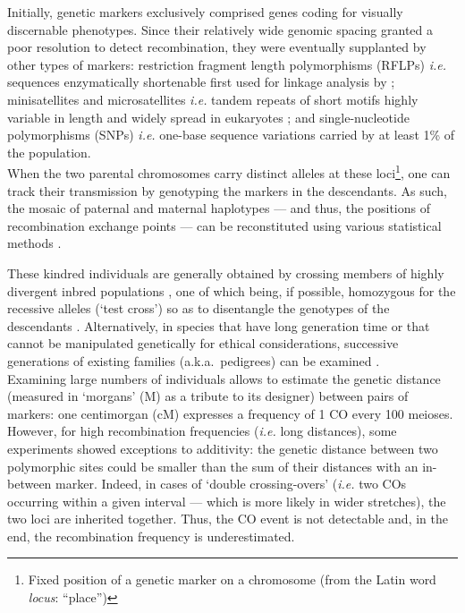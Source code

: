 Initially, genetic markers exclusively comprised genes coding for visually discernable phenotypes.
Since their relatively wide genomic spacing granted a poor resolution to detect recombination, they were eventually supplanted by other types of markers: restriction fragment length polymorphisms (RFLPs) \textit{i.e.} sequences enzymatically shortenable first used for linkage analysis by \citet{botstein1980construction}; minisatellites and microsatellites \citep{hamada1982potential} \textit{i.e.} tandem repeats of short motifs highly variable in length \citep{ellegren2004microsatellites} and widely spread in eukaryotes \citep{hamada1982novel}; and single-nucleotide polymorphisms (SNPs) \textit{i.e.} one-base sequence variations carried by at least 1\% of the population.\\

When the two parental chromosomes carry distinct alleles at these loci\footnote{Fixed position of a genetic marker on a chromosome (from the Latin word \textit{locus}: “place”)}, one can track their transmission by genotyping the markers in the descendants.
As such, the mosaic of paternal and maternal haplotypes — and thus, the positions of recombination exchange points — can be reconstituted using various statistical methods \citep[reviewed in \citealp{backstrom2009gene}]{haldane1919combination, kosambi1943estimation}.

These kindred individuals are generally obtained by crossing members of highly divergent inbred populations \citep[\textit{e.g.}][]{rowe1994maps,dietrich1996comprehensive}, one of which being, if possible, homozygous for the recessive alleles (‘test cross’) so as to disentangle the genotypes of the descendants \citep[reviewed in][]{brown2002mapping}.
Alternatively, in species that have long generation time or that cannot be manipulated genetically for ethical considerations, successive generations of existing families (a.k.a.\ pedigrees) can be examined \citep[\textit{e.g.}][]{kong2002highresolution,kong2010finescale,cox2009new}.\\

Examining large numbers of individuals allows to estimate the genetic distance (measured in ‘morgans’ (M) as a tribute to its designer) between pairs of markers: one centimorgan (cM) expresses a frequency of 1 CO every 100 meioses.
However, for high recombination frequencies (\textit{i.e.} long distances), some experiments \citep[\textit{e.g.}][]{morgan1911random,morgan1912data} showed exceptions to additivity: the genetic distance between two polymorphic sites could be smaller than the sum of their distances with an in-between marker.
Indeed, in cases of ‘double crossing-overs’ (\textit{i.e.} two COs occurring within a given interval — which is more likely in wider stretches), the two loci are inherited together.
Thus, the CO event is not detectable and, in the end, the recombination frequency is underestimated.

